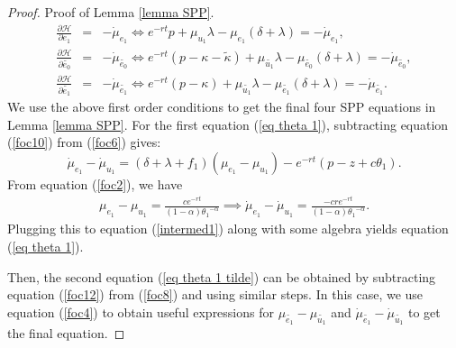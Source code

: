 \documentclass[12pt]{article} %
\theoremstyle{definition}
\begin{document}
\begin{proof}{Proof of Lemma \ref{lemma SPP}.}
\begin{eqnarray}
       \frac{\partial \mathcal{H}}{\partial e_1}  &=& -\dot{\mu}_{e_1} \iff e^{-rt}p+\mu_{u_1} \lambda -\mu_{e_1}(\delta + \lambda) = -\dot{\mu}_{e_1}, \label{foc10}\\
        \frac{\partial \mathcal{H}}{\partial \tilde{e_0}}  &=& -\dot{\mu}_{\tilde{e_0}} \iff e^{-rt}(p-\kappa-\tilde{\kappa})+\mu_{\tilde{u_1}} \lambda -\mu_{\tilde{e_0}}(\delta + \lambda) = -\dot{\mu}_{\tilde{e_0}}, \label{foc11}\\
         \frac{\partial \mathcal{H}}{\partial \tilde{e_1}}  &=& -\dot{\mu}_{\tilde{e_1}} \iff e^{-rt}(p-\kappa)+\mu_{\tilde{u_1}} \lambda -\mu_{\tilde{e_1}}(\delta + \lambda) = -\dot{\mu}_{\tilde{e_1}}. \label{foc12}
\end{eqnarray}
We use the above first order conditions to get the final four SPP equations in Lemma \ref{lemma SPP}. For the first equation (\ref{eq theta 1}), subtracting equation (\ref{foc10}) from (\ref{foc6}) gives:
\begin{equation}
   \dot{\mu}_{e_1}-\dot{\mu}_{u_1}=(\delta + \lambda+f_1)(\mu_{e_1}-\mu_{u_1})-e^{-rt}(p-z+c\theta_1). \label{intermed1}
\end{equation}
From equation (\ref{foc2}), we have
\begin{eqnarray*}
 \mu_{e_1}-\mu_{u_1} = \frac{ce^{-rt}}{(1-\alpha){\theta_1}^{-\alpha}} \implies  \dot{\mu}_{e_1}-\dot{\mu}_{u_1} = \frac{-cre^{-rt}}{(1-\alpha){\theta_1}^{-\alpha}}.
\end{eqnarray*}
Plugging this to equation (\ref{intermed1}) along with some algebra yields equation (\ref{eq theta 1}). 

Then, the second equation (\ref{eq theta 1 tilde}) can be obtained by subtracting equation (\ref{foc12}) from (\ref{foc8}) and using similar steps. In this case, we use equation (\ref{foc4}) to obtain useful expressions for $\mu_{\tilde{e_1}}-\mu_{\tilde{u_1}}$ and $\dot{\mu}_{\tilde{e_1}}-\dot{\mu}_{\tilde{u_1}}$ to get the final equation. 


\end{proof}
\end{document}
